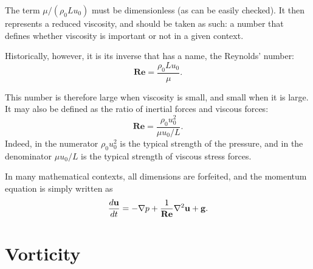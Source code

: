 The term $\mu /( \rho_ 0 L u_0)$ must be dimensionless (as can be
easily checked). It then represents a reduced viscosity, and should be
taken as such: a number that defines whether viscosity is important or
not in a given context.

Historically, however, it is its inverse that has a name, the
Reynolds' number:
\begin{equation}
  \mathbf{Re}= \frac{\rho_ 0 L u_0 }{\mu }.
\end{equation}

This number is therefore large when viscosity is small, and small when
it is large. It may also be defined as the ratio of inertial forces and
viscous forces:
\begin{equation}
  \mathbf{Re}= \frac{\rho_ 0 u^2_0 }{\mu u_0 / L }.
\end{equation}
Indeed, in the numerator $\rho_ 0 u^2_0$ is the typical strength of the
pressure, and in the denominator $\mu u_0 / L $ is the typical
strength of viscous stress forces.

In many mathematical contexts, all dimensions are forfeited, and the
momentum equation is simply written as
\begin{equation}
  \label{eq:NS_usual_reduced}
  \frac{d\mathbf{u} }{dt} =
  - \nabla p 
  + \frac{1}{\mathbf{Re}} \nabla^2 \mathbf{u}
  + \mathbf{g} .
\end{equation}







\section{Vorticity}
\label{sec:NS_vort}

